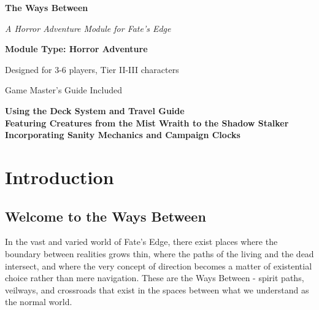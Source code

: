 \documentclass[11pt]{article}
\begin{document}
\begin{titlepage}
\centering
\vspace*{2cm}

{\Huge\bfseries\color{headercolor} The Ways Between} 

\vspace{0.5cm}

{\Large\itshape A Horror Adventure Module for Fate's Edge}

\vspace{2cm}

\vspace{2cm}

{\Large\bfseries Module Type: Horror Adventure}

\vspace{1cm}

{\large Designed for 3-6 players, Tier II-III characters}

\vspace{1cm}

{\large Game Master's Guide Included}

\vfill

{\large 
\textbf{Using the Deck System and Travel Guide} \\
\textbf{Featuring Creatures from the Mist Wraith to the Shadow Stalker} \\
\textbf{Incorporating Sanity Mechanics and Campaign Clocks}
}

\end{titlepage}

\newpage

\tableofcontents

\newpage

\section{Introduction}

\subsection{Welcome to the Ways Between}

In the vast and varied world of Fate's Edge, there exist places where the boundary between realities grows thin, where the paths of the living and the dead intersect, and where the very concept of direction becomes a matter of existential choice rather than mere navigation. These are the Ways Between - spirit paths, veilways, and crossroads that exist in the spaces between what we understand as the normal world.
\end{document}
